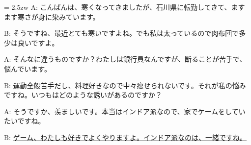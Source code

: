 \documentclass[11pt]{amsart}
\title{}
\author{}
\newenvironment{hangall}[1]{\hangindent = 2.5zw\everypar{\hangindent = 2.5zw}}{}
\begin{document}
\maketitle
\begin{hangall}{}%
A: こんばんは、寒くなってきましたが、石川県に転勤してきて、ますます寒さが身に染みています。

B: そうですね、最近とても寒いですよね。でも私は太っているので肉布団で多少は良いですよ。

A: そんなに違うものですか？わたしは銀行員なんですが、断ることが苦手で、悩んでいます。

B: 運動全般苦手だし、料理好きなので中々痩せられないです。それが私の悩みですね。いつもはどのような誘いがあるのですか？

A: そうですか、羨ましいです。本当はインドア派なので、家でケームをしていたいですね。

B: \ul{ゲーム、わたしも好きでよくやりますよ。インドア派なのは、一緒ですね。}\end{hangall}
\end{document}

